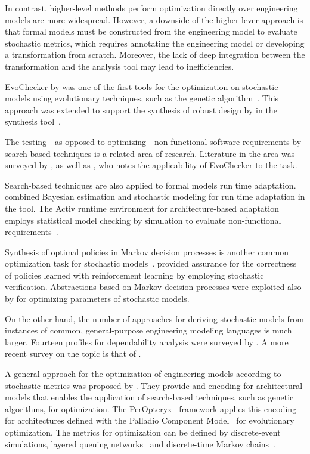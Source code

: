 In contrast, higher-level methods perform optimization directly over engineering models are more widespread. However, a downside of the higher-lever approach is that formal models must be constructed from the engineering model to evaluate stochastic metrics, which requires annotating the engineering model or developing a transformation from scratch. Moreover, the lack of deep integration between the transformation and the analysis tool may lead to inefficiencies.

EvoChecker by \citet{Gerasimou15evochecker} was one of the first tools for the optimization on stochastic models using evolutionary techniques, such as the  genetic algorithm~\citep{Deb02nsga}. This approach was extended to support the synthesis of robust design by \citet{Calinescu17robust} in the  synthesis tool~\citep{Calinescu17rodes}.

The testing---as opposed to optimizing---non-functional software requirements by search-based techniques is a related area of research. Literature in the area was surveyed by \citet{Afzal09testing}, as well as \citet{Parasa16testing}, who notes the applicability of EvoChecker to the task.

Search-based techniques are also applied to formal models run time adaptation. \citet{Epifani09adaptation} combined Bayesian estimation and stochastic modeling for run time adaptation in the  tool. The Activ runtime environment for architecture-based adaptation employs statistical model checking by simulation to evaluate non-functional requirements~\citep{Iftikhar17activforms}.

Synthesis of optimal policies in Markov decision processes is another common optimization task for stochastic models~\citep{Baier17maximizing}. \citet{Mason17assurance} provided assurance for the correctness of policies learned with reinforcement learning by employing stochastic verification. Abstractions based on Markov decision processes were exploited also by \citet{Quatmann16mdp} for optimizing parameters of stochastic models. 

On the other hand, the number of approaches for deriving stochastic models from instances of common,  general-purpose engineering modeling languages is much larger. Fourteen  profiles for dependability analysis were surveyed by \citet{Bernardi08umlprofile}. A more recent survey on the topic is that of \citet{Koziolek10review}.

A general approach for the optimization of engineering models according to stochastic metrics was proposed by \citet{Koziolek11generic}. They provide and encoding for architectural models that enables the application of search-based techniques, such as genetic algorithms, for optimization. The PerOpteryx~\citep{Martens10evolutionary} framework applies this encoding for architectures defined with the Palladio Component Model~\citep{Becker08palladio} for evolutionary optimization. The metrics for optimization can be defined by discrete-event simulations, layered queuing networks~\citep{Franks09lqn} and discrete-time Markov chains~\citep{Koziolek09dependencies}.


